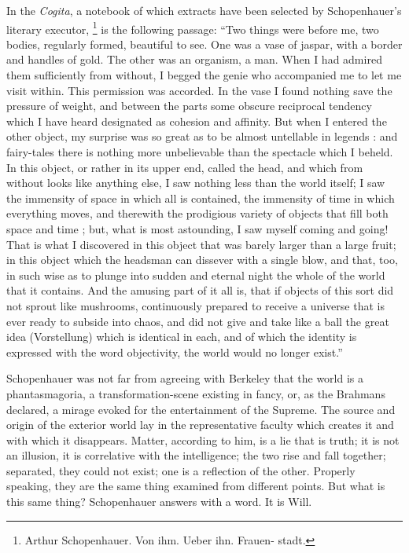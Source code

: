 \documentclass[]{book}
\let\rmarkdownfootnote\footnote%
\def\footnote{\protect\rmarkdownfootnote}
\begin{document}
In the \emph{Cogita}, a notebook of which extracts have been selected by
Schopenhauer's literary executor, \footnote{Arthur Schopenhauer. Von
  ihm. Ueber ihn. Frauen- stadt.} is the following passage: ``Two things
were before me, two bodies, regularly formed, beautiful to see. One was
a vase of jaspar, with a border and handles of gold. The other was an
organism, a man. When I had admired them sufficiently from without, I
begged the genie who accompanied me to let me visit within. This
permission was accorded. In the vase I found nothing save the pressure
of weight, and between the parts some obscure reciprocal tendency which
I have heard designated as cohesion and affinity. But when I entered the
other object, my surprise was so great as to be almost untellable in
legends : and fairy-tales there is nothing more unbelievable than the
spectacle which I beheld. In this object, or rather in its upper end,
called the head, and which from without looks like anything else, I saw
nothing less than the world itself; I saw the immensity of space in
which all is contained, the immensity of time in which everything moves,
and therewith the prodigious variety of objects that fill both space and
time ; but, what is most astounding, I saw myself coming and going! That
is what I discovered in this object that was barely larger than a large
fruit; in this object which the headsman can dissever with a single
blow, and that, too, in such wise as to plunge into sudden and eternal
night the whole of the world that it contains. And the amusing part of
it all is, that if objects of this sort did not sprout like mushrooms,
continuously prepared to receive a universe that is ever ready to
subside into chaos, and did not give and take like a ball the great idea
(Vorstellung) which is identical in each, and of which the identity is
expressed with the word objectivity, the world would no longer exist.''

Schopenhauer was not far from agreeing with Berkeley that the world is a
phantasmagoria, a transformation-scene existing in fancy, or, as the
Brahmans declared, a mirage evoked for the entertainment of the Supreme.
The source and origin of the exterior world lay in the representative
faculty which creates it and with which it disappears. Matter, according
to him, is a lie that is truth; it is not an illusion, it is correlative
with the intelligence; the two rise and fall together; separated, they
could not exist; one is a reflection of the other. Properly speaking,
they are the same thing examined from different points. But what is this
same thing? Schopenhauer answers with a word. It is Will.
\end{document}
